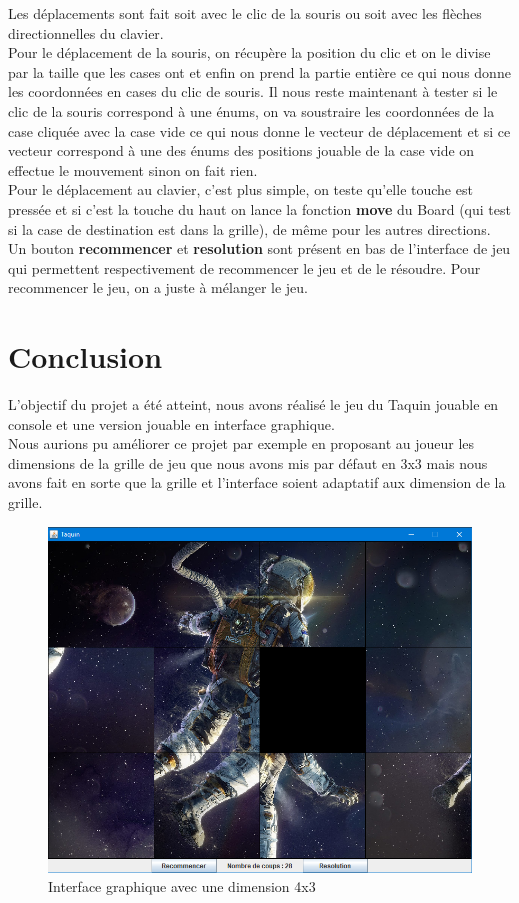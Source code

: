 \documentclass[a4paper,12pt]{article} %
\begin{document}
\newpage

Les déplacements sont fait soit avec le clic de la souris ou soit avec les flèches directionnelles du clavier.\\
Pour le déplacement de la souris, on récupère la position du clic et on le divise par la taille que les cases ont et enfin on prend la partie entière ce qui nous donne les coordonnées en cases du clic de souris. Il nous reste maintenant à tester si le clic de la souris correspond à une énums, on va soustraire les coordonnées de la case cliquée avec la case vide ce qui nous donne le vecteur de déplacement et si ce vecteur correspond à une des énums des positions jouable de la case vide on effectue le mouvement sinon on fait rien.\\
Pour le déplacement au clavier, c'est plus simple, on teste qu'elle touche est pressée et si c'est la touche du haut on lance la fonction \textbf{move} du Board (qui test si la case de destination est dans la grille), de même pour les autres directions.\\

Un bouton \textbf{recommencer} et \textbf{resolution} sont présent en bas de l'interface de jeu qui permettent respectivement de recommencer le jeu et de le résoudre. Pour recommencer le jeu, on a juste à mélanger le jeu.

\section*{Conclusion}

L'objectif du projet a été atteint, nous avons réalisé le jeu du Taquin jouable en console et une version jouable en interface graphique.\\

Nous aurions pu améliorer ce projet par exemple en proposant au joueur les dimensions de la grille de jeu que nous avons mis par défaut en 3x3 mais nous avons fait en sorte que la grille et l'interface soient adaptatif aux dimension de la grille.

\newpage

\begin{figure}[!h]
\centering
\includegraphics[scale=0.6]{images/Capture8.PNG}
\caption{Interface graphique avec une dimension 4x3}
\end{figure}
\end{document}
